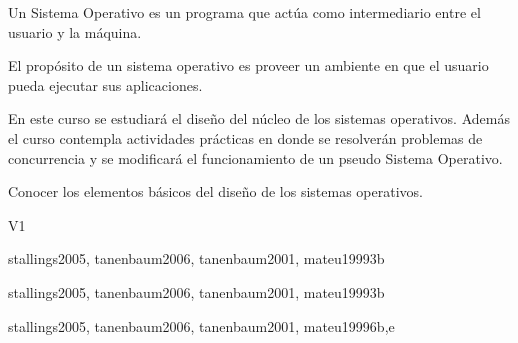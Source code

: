 \begin{syllabus}


\begin{justification}
    Un Sistema Operativo es un programa que actúa como intermediario entre el usuario y la máquina.
    
    El propósito de un sistema operativo es proveer un ambiente en que el usuario pueda ejecutar sus aplicaciones.
    
    En este curso se estudiará el diseño del núcleo de los sistemas operativos.
    Además el curso contempla actividades prácticas en donde se resolverán problemas de 
    concurrencia y se modificará el funcionamiento de un pseudo Sistema Operativo.
\end{justification}

\begin{goals}
\item Conocer los elementos básicos del diseño de los sistemas operativos.
\end{goals}

\begin{outcomes}{V1}
    \item {}
    \item {}
    \item {}
    \item {}
\end{outcomes}

\begin{unit}{\ALAlgorithmicStrategies}{}{stallings2005, tanenbaum2006, tanenbaum2001, mateu1999}{3}{b}
    \ALAlgorithmicStrategiesAllTopics
    \ALAlgorithmicStrategiesAllLearningOutcomes
\end{unit}

\begin{unit}{\OSOverviewofOperatingSystems}{}{stallings2005, tanenbaum2006, tanenbaum2001, mateu1999}{3}{b}
    \OSOverviewofOperatingSystemsAllTopics
    \OSOverviewofOperatingSystemsAllLearningOutcomes
\end{unit}

\begin{unit}{\OSOperatingSystemPrinciples}{}{stallings2005, tanenbaum2006, tanenbaum2001, mateu1999}{6}{b,e}
    \OSOperatingSystemPrinciplesAllTopics
    \OSOperatingSystemPrinciplesAllLearningOutcomes
\end{unit}


\end{syllabus}
